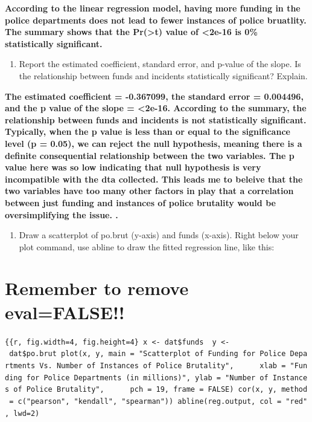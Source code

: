 \documentclass[
]{article}
\providecommand{\tightlist}{%
  \setlength{\itemsep}{0pt}\setlength{\parskip}{0pt}}
\begin{document}
\textbf{According to the linear regression model, having more funding in
the police departments does not lead to fewer instances of police
bruatlity. The summary shows that the Pr(\textgreater\textbar t\textbar)
value of \textless2e-16 is 0\% statistically significant.}

\begin{enumerate}
\def\labelenumi{\alph{enumi}.}
\setcounter{enumi}{1}
\tightlist
\item
  Report the estimated coefficient, standard error, and p-value of the
  slope. Is the relationship between funds and incidents statistically
  significant? Explain.
\end{enumerate}

\textbf{The estimated coefficient = -0.367099, the standard error =
0.004496, and the p value of the slope = \textless2e-16. According to
the summary, the relationship between funds and incidents is not
statistically significant. Typically, when the p value is less than or
equal to the significance level (p = 0.05), we can reject the null
hypothesis, meaning there is a definite consequential relationship
between the two variables. The p value here was so low indicating that
null hypothesis is very incompatible with the dta collected. This leads
me to beleive that the two variables have too many other factors in play
that a correlation between just funding and instances of police
brutality would be oversimplifying the issue. .}

\begin{enumerate}
\def\labelenumi{\alph{enumi}.}
\setcounter{enumi}{2}
\tightlist
\item
  Draw a scatterplot of po.brut (y-axis) and funds (x-axis). Right below
  your plot command, use abline to draw the fitted regression line, like
  this:
\end{enumerate}

\hypertarget{remember-to-remove-evalfalse}{%
\section{Remember to remove
eval=FALSE!!}\label{remember-to-remove-evalfalse}}

\texttt{\{\{r,\ fig.width=4,\ fig.height=4\}\ x\ \textless{}-\ dat\$funds\ \ y\ \textless{}-\ dat\$po.brut\ plot(x,\ y,\ main\ =\ "Scatterplot\ of\ Funding\ for\ Police\ Departments\ Vs.\ Number\ of\ Instances\ of\ Police\ Brutality",\ \ \ \ \ \ xlab\ =\ "Funding\ for\ Police\ Departments\ (in\ millions)",\ ylab\ =\ "Number\ of\ Instances\ of\ Police\ Brutality",\ \ \ \ \ \ pch\ =\ 19,\ frame\ =\ FALSE)\ cor(x,\ y,\ method\ =\ c("pearson",\ "kendall",\ "spearman"))\ abline(reg.output,\ col\ =\ "red",\ lwd=2)}
\end{document}
